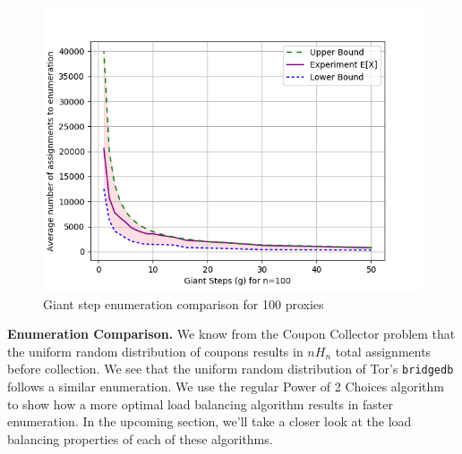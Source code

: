 \begin{figure}[h!]
\centering
     \includegraphics[width=1.0\textwidth]{fig/needle_expected_value_n_100.png}
    \caption{Giant step enumeration comparison for 100 proxies}

    \label{fig:gsn100}
\end{figure}

\textbf{Enumeration Comparison.} We know from the Coupon Collector problem that the uniform random distribution of coupons results in $nH_n$ total assignments before collection. We see that the uniform random distribution of Tor's \texttt{bridgedb} follows a similar enumeration. We use the regular Power of 2 Choices algorithm to show how a more optimal load balancing algorithm results in faster enumeration\cite{xu2011generalized}. In the upcoming section, we'll take a closer look at the load balancing properties of each of these algorithms.


